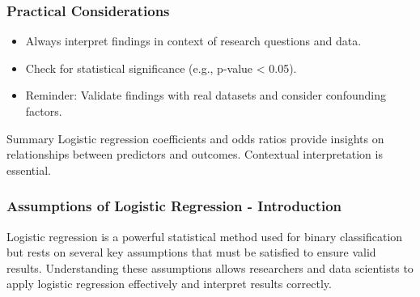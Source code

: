 \documentclass[aspectratio=169]{beamer}
\begin{document}
\begin{frame}[fragile]
    \frametitle{Practical Considerations}
    \begin{itemize}
        \item Always interpret findings in context of research questions and data.
        \item Check for statistical significance (e.g., p-value < 0.05).
        \item Reminder: Validate findings with real datasets and consider confounding factors.
    \end{itemize}
    
    \begin{block}{Summary}
        Logistic regression coefficients and odds ratios provide insights on relationships between predictors and outcomes. Contextual interpretation is essential.
    \end{block}
\end{frame}

\begin{frame}[fragile]
    \frametitle{Assumptions of Logistic Regression - Introduction}
    Logistic regression is a powerful statistical method used for binary classification but rests on several key assumptions that must be satisfied to ensure valid results. Understanding these assumptions allows researchers and data scientists to apply logistic regression effectively and interpret results correctly.
\end{frame}
\end{document}
